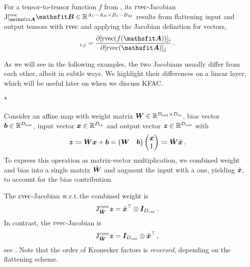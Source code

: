\begin{definition}\label{def:rvec_jacobian}
  For a tensor-to-tensor function $f$ from , its $\operatorname{rvec}$-Jacobian $\jac^{\rvec}_{\tA}\tB \in \sR^{A_1 \cdots A_N \times B_1 \cdots B_M}$ results from flattening input and output tensors with $\operatorname{rvec}$ and applying the Jacobian definition for vectors,
  \begin{align*}
    [\jac^{\rvec}_{\tA}\tB]_{i,j}
    =
    \frac{\partial [\rvec(f(\tA))]_i}{\partial [\rvec(\tA)]_j}\,.
  \end{align*}
\end{definition}

As we will see in the following examples, the two Jacobians usually differ from each other, albeit in subtle ways. We highlight their differences on a linear layer, which will be useful later on when we discuss KFAC.

\switchcolumn[1]*
\switchcolumn[0]

\begin{example}\label{ex:weight_jacobians_linear_layer}
  Consider an affine map with weight matrix ${\bm{W}} \in {\mathbb{R}}^{D_{\text{out}} \times D_{\text{in}}}$, bias vector ${\bm{b}} \in {\mathbb{R}}^{D_{\text{out}}}$, input vector ${\bm{x}} \in {\mathbb{R}}^{D_{\text{in}}}$ and output vector ${\bm{z}} \in {\mathbb{R}}^{D_{\text{out}}}$ with
  \begin{align*}
    {\bm{z}}
    \coloneqq
    {\bm{W}} {\bm{x}} + {\bm{b}}
    =
    \begin{pmatrix}
      {\bm{W}} & {\bm{b}}
    \end{pmatrix}
    \begin{pmatrix}
      {\bm{x}} \\ 1
    \end{pmatrix}
    \coloneqq
    \tilde{{\bm{W}}}
    \tilde{{\bm{x}}}\,.
  \end{align*}
  To express this operation as matrix-vector multiplication, we combined weight and bias into a single matrix $\tilde{{\bm{W}}}$ and augment the input with a one, yielding $\tilde{{\bm{x}}}$, to account for the bias contribution.

  The $\operatorname{cvec}$-Jacobian w.r.t.\,the combined weight is
  \begin{align*}
    \mathrm{J}^{\operatorname{cvec}}_{\tilde{{\bm{W}}}}{\bm{z}}
    =
    \tilde{{\bm{x}}}^{\top}
    \otimes
    {\bm{I}}_{D_{\text{out}}}\,.
  \end{align*}
  In contrast, the $\operatorname{rvec}$-Jacobian is
  \begin{align*}
    \mathrm{J}^{\operatorname{cvec}}_{\tilde{{\bm{W}}}}{\bm{z}}
    =
    {\bm{I}}_{D_{\text{out}}}
    \otimes
    \tilde{{\bm{x}}}^{\top}\,,
  \end{align*}
  see .
  Note that the order of Kronecker factors is \emph{reversed}, depending on the flattening scheme.
\end{example}


